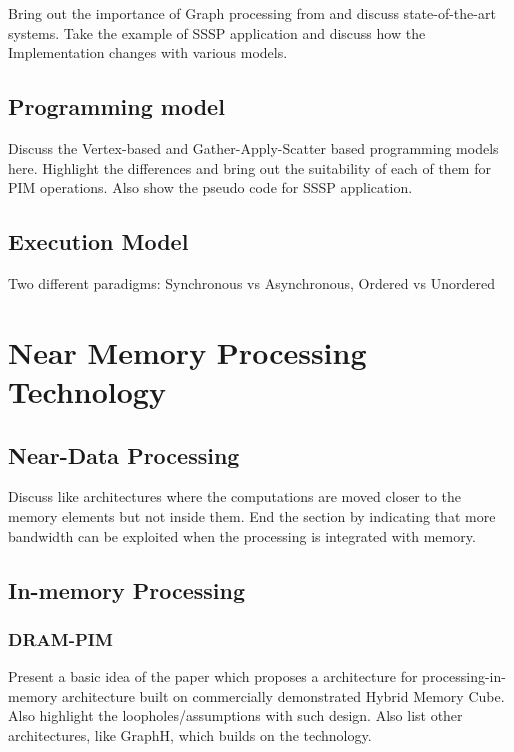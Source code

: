 \documentclass[journal,onecolumn]{IEEEtran}
\begin{document}
Bring out the importance of Graph processing from \cite{BrainGraph,RoadGraph, SocialGraph} and discuss state-of-the-art systems. Take the example of SSSP application and discuss how the Implementation changes with various models.


  \subsection{Programming model}
    Discuss the Vertex-based \cite{Pregel} and Gather-Apply-Scatter\cite{PowerGraph} based programming models here. Highlight the differences and bring out the suitability of each of them for PIM operations. Also show the pseudo code for SSSP application.

  \subsection{Execution Model}
    Two different paradigms: Synchronous vs Asynchronous\cite{Tesseract}, Ordered vs Unordered\cite{OvsUO}

\section{Near Memory Processing Technology}

  \subsection{Near-Data Processing}
  Discuss \cite{Biscuit} like architectures where the computations are moved closer to the memory elements but not inside them.
  End the section by indicating that more bandwidth can be exploited when the processing is integrated with memory.
  
  \subsection{In-memory Processing}
      
    \subsubsection{DRAM-PIM}
      Present a basic idea of the \cite{AMC} paper which proposes a architecture for processing-in-memory architecture built on commercially demonstrated Hybrid Memory Cube. Also highlight the loopholes/assumptions with such design. Also list other architectures, like GraphH\cite{GraphH}, which builds on the technology.
\end{document}
